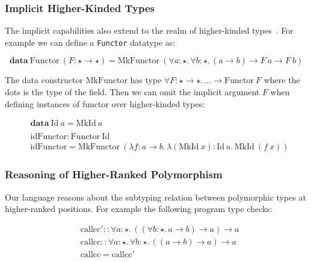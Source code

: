 \subsubsection{Implicit Higher-Kinded Types}

The implicit capabilities also extend to the realm of higher-kinded types~\cite{}. For example
we can define a \verb|Functor| datatype as:

\newcommand{\Functor}[0]{\mathrm{Functor}}
\newcommand{\MkFunctor}[0]{\mathrm{MkFunctor}}
\newcommand{\Id}[0]{\mathrm{Id}}
\newcommand{\MkId}[0]{\mathrm{MkId}}

\begin{equation*}
  \mathbf{data}~\Functor~(F : \star \rightarrow \star) = \MkFunctor~(\forall a : \star.\, \forall b : \star.\, (a \rightarrow b) \rightarrow F~a \rightarrow F~b)
\end{equation*}

The data constructor $\MkFunctor$ has type $\forall F : \star \rightarrow \star.\, \dots \rightarrow \Functor~F$ where the dots is the type of the field.
Then we can omit the implicit argument $F$ when defining instances of functor over higher-kinded types:

\begin{align*}
  & \mathbf{data}~\mathrm{Id}~a=\mathrm{MkId}~a \\
  \\
  & \mathrm{idFunctor} : \Functor~\Id \\
  & \mathrm{idFunctor} = \MkFunctor~(\lambda f : a \rightarrow b.\, \lambda (\MkId~x) : \Id~a.\, \MkId~(f~x))
\end{align*}

\subsubsection{Reasoning of Higher-Ranked Polymorphism}
\label{sec:higher-ranked-poly}

Our language reasons about the subtyping relation between polymorphic types at
higher-ranked positions. For example the following program type checks:

\begin{align*}
& \mathrm{callcc}' :: \forall a : \star.\, ((\forall b : \star.\, a \rightarrow b) \rightarrow a) \rightarrow a \\
& \mathrm{callcc} :: \forall a : \star.\, \forall b : \star.\, ((a \rightarrow b) \rightarrow a) \rightarrow a \\
& \mathrm{callcc} = \mathrm{callcc}'
\end{align*}

